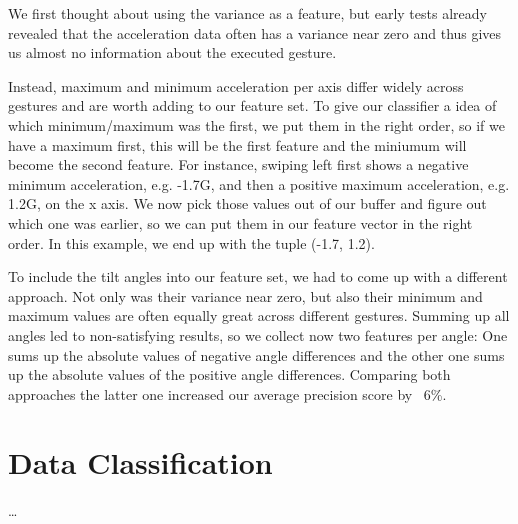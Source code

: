 We  first  thought  about  using  the  variance  as  a  feature,  but  early  tests  already revealed  that  the  acceleration  data  often  has  a  variance  near  zero  and  thus  gives  us almost no information about the executed gesture.

Instead,  maximum  and  minimum  acceleration  per  axis  differ  widely  across gestures  and  are  worth  adding  to  our  feature  set.
To give our classifier a idea of which minimum/maximum was the first, we put them in the right order, so if we have a maximum first, this will be the first feature and the miniumum will become the second feature.
For  instance,  swiping  left  first  shows  a negative  minimum  acceleration, e.g. -1.7G, and then a positive  maximum acceleration, e.g. 1.2G, on the x axis.
We now pick those values out of our buffer and figure out which one was earlier, so we can put them in our feature vector in the right order.
In  this example, we end up with the tuple (-1.7, 1.2).

To include the tilt angles into our feature set, we had to come up with a different approach.
Not only was their variance near zero, but also their minimum and maximum values  are  often  equally  great  across  different  gestures. 
Summing  up  all  angles  led  to non-satisfying  results,  so  we  collect  now  two  features  per  angle:
One  sums  up  the absolute  values  of  negative  angle  differences  and  the  other  one  sums  up  the  absolute values  of  the  positive  angle  differences.
Comparing  both  approaches  the  latter  one increased our average precision  score by ~6\%.

\section{Data Classification}
\label{ch:DataCollection:sec:DataClassification}

\dots

